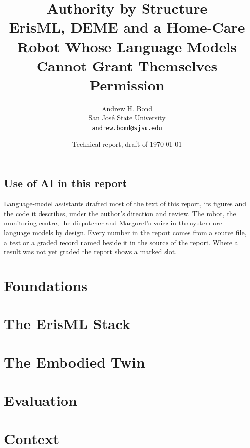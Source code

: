 \documentclass[11pt,openany]{report}
\title{Authority by Structure\\[6pt]
\large ErisML, DEME and a Home-Care Robot Whose Language Models Cannot Grant Themselves Permission}
\author{Andrew H. Bond\\San Jos\'e State University\\\texttt{andrew.bond@sjsu.edu}}
\date{Technical report, draft of \today}
\renewcommand{\_}{\oldunderscore\allowbreak}
\begin{document}
\maketitle

\begin{abstract}

\end{abstract}

\chapter*{Use of AI in this report}
Language-model assistants drafted most of the text of this report, its figures and the code it
describes, under the author's direction and review. The robot, the monitoring centre, the
dispatcher and Margaret's voice in the system are language models by design. Every number in the
report comes from a source file, a test or a graded record named beside it in the source of the
report. Where a result was not yet graded the report shows a marked slot.



\tableofcontents

\part{Foundations}




\part{The ErisML Stack}





\part{The Embodied Twin}




\part{Evaluation}



\part{Context}



\appendix






\end{document}

